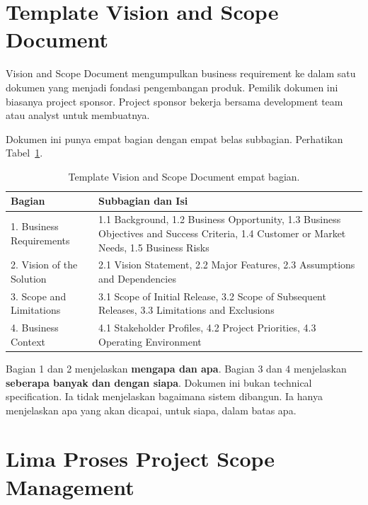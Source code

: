 \documentclass[11pt,a4paper]{article}
\begin{document}
\section{Template Vision and Scope Document}

Vision and Scope Document mengumpulkan business requirement ke dalam satu dokumen yang menjadi fondasi pengembangan produk. Pemilik dokumen ini biasanya project sponsor. Project sponsor bekerja bersama development team atau analyst untuk membuatnya.

Dokumen ini punya empat bagian dengan empat belas subbagian. Perhatikan Tabel~\ref{tab:template}.

\begin{table}[H]
	\centering
	\caption{Template Vision and Scope Document empat bagian.}
	\label{tab:template}
	\footnotesize
	\begin{tabularx}{\textwidth}{l X}
		\toprule
		Bagian                    & Subbagian dan Isi                                                                                                                        \\
		\midrule
		1. Business Requirements  & 1.1 Background, 1.2 Business Opportunity, 1.3 Business Objectives and Success Criteria, 1.4 Customer or Market Needs, 1.5 Business Risks \\
		2. Vision of the Solution & 2.1 Vision Statement, 2.2 Major Features, 2.3 Assumptions and Dependencies                                                               \\
		3. Scope and Limitations  & 3.1 Scope of Initial Release, 3.2 Scope of Subsequent Releases, 3.3 Limitations and Exclusions                                           \\
		4. Business Context       & 4.1 Stakeholder Profiles, 4.2 Project Priorities, 4.3 Operating Environment                                                              \\
		\bottomrule
	\end{tabularx}
\end{table}

Bagian 1 dan 2 menjelaskan \textbf{mengapa dan apa}. Bagian 3 dan 4 menjelaskan \textbf{seberapa banyak dan dengan siapa}. Dokumen ini bukan technical specification. Ia tidak menjelaskan bagaimana sistem dibangun. Ia hanya menjelaskan apa yang akan dicapai, untuk siapa, dalam batas apa.

\section{Lima Proses Project Scope Management}
\end{document}
